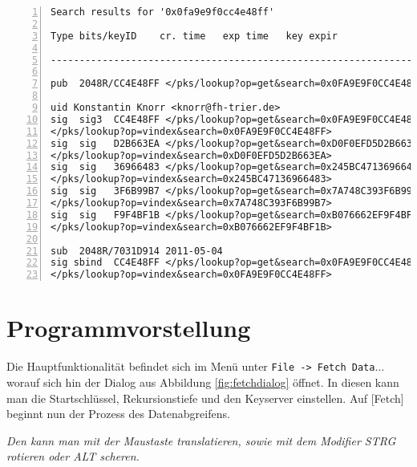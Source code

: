 \documentclass[11pt,a4paper]{scrartcl}
\begin{document}
\lstset{language=}
\lstset{postbreak=\space, breakindent=5pt, breaklines}

\begin{lstlisting}[basicstyle={\footnotesize},frame=tbLR,numbers=left,showspaces=true,float=tb,caption={Anwort auf eine Schlüsselanfrage für \texttt{0x0FA9E9F0CC4E48FF}},label=lst:reply,linewidth=\textwidth,]
Search results for '0x0fa9e9f0cc4e48ff'

Type bits/keyID    cr. time   exp time   key expir

------------------------------------------------------------------------

pub  2048R/CC4E48FF </pks/lookup?op=get&search=0x0FA9E9F0CC4E48FF> 2011-05-04            

uid Konstantin Knorr <knorr@fh-trier.de>
sig  sig3  CC4E48FF </pks/lookup?op=get&search=0x0FA9E9F0CC4E48FF> 2011-05-04 __________ __________ [selfsig]
</pks/lookup?op=vindex&search=0x0FA9E9F0CC4E48FF>
sig  sig   D2B663EA </pks/lookup?op=get&search=0xD0F0EFD5D2B663EA> 2011-05-12 __________ __________ Martin Kock <kockm@fh-trier.de>
</pks/lookup?op=vindex&search=0xD0F0EFD5D2B663EA>
sig  sig   36966483 </pks/lookup?op=get&search=0x245BC47136966483> 2011-05-24 __________ __________ []
</pks/lookup?op=vindex&search=0x245BC47136966483>
sig  sig   3F6B99B7 </pks/lookup?op=get&search=0x7A748C393F6B99B7> 2011-05-31 __________ __________ David Weich <weichd@fh-trier.de>
</pks/lookup?op=vindex&search=0x7A748C393F6B99B7>
sig  sig   F9F4BF1B </pks/lookup?op=get&search=0xB076662EF9F4BF1B> 2011-05-31 __________ __________ Alexander Weigl <weigla@fh-trier.de>
</pks/lookup?op=vindex&search=0xB076662EF9F4BF1B>

sub  2048R/7031D914 2011-05-04            
sig sbind  CC4E48FF </pks/lookup?op=get&search=0x0FA9E9F0CC4E48FF> 2011-05-04 __________ __________ []
</pks/lookup?op=vindex&search=0x0FA9E9F0CC4E48FF>
\end{lstlisting}


\section{Programmvorstellung}
Die Hauptfunktionalität befindet sich im Menü unter \texttt{File -> Fetch Data$\ldots$} worauf sich hin der Dialog aus Abbildung \ref{fig:fetchdialog} öffnet. In diesen kann man die Startschlüssel, Rekursionstiefe und den Keyserver einstellen. Auf [Fetch] beginnt nun der Prozess des Datenabgreifens.

\emph{Den kann man mit der Maustaste translatieren, sowie mit dem Modifier STRG rotieren oder ALT scheren.}
\end{document}

